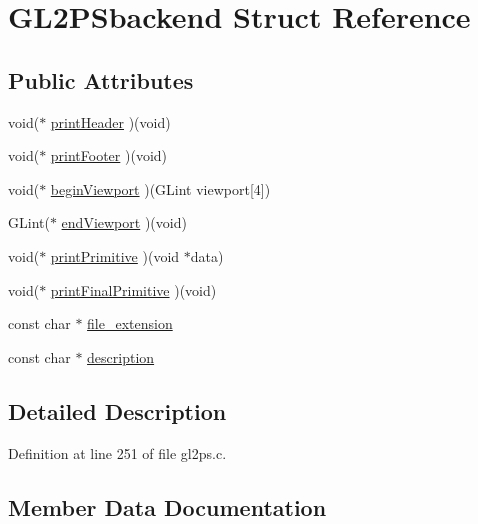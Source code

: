 \hypertarget{struct_g_l2_p_sbackend}{}\section{G\+L2\+P\+Sbackend Struct Reference}
\label{struct_g_l2_p_sbackend}
\subsection*{Public Attributes}
\begin{DoxyCompactItemize}
\item 
void($\ast$ \hyperlink{struct_g_l2_p_sbackend_afdd2bc2b0684ab6bda7f72ce1561bef9}{print\+Header} )(void)
\item 
void($\ast$ \hyperlink{struct_g_l2_p_sbackend_ae7d08efe5024f7e407c63d116cb0ba14}{print\+Footer} )(void)
\item 
void($\ast$ \hyperlink{struct_g_l2_p_sbackend_ae71958ad18c3dbeffdbb3f6895d0bbbf}{begin\+Viewport} )(G\+Lint viewport\mbox{[}4\mbox{]})
\item 
G\+Lint($\ast$ \hyperlink{struct_g_l2_p_sbackend_a73e6d71a33d571184eed89ef1e575786}{end\+Viewport} )(void)
\item 
void($\ast$ \hyperlink{struct_g_l2_p_sbackend_ac2d22418854178ec0e962f684ff3f27e}{print\+Primitive} )(void $\ast$data)
\item 
void($\ast$ \hyperlink{struct_g_l2_p_sbackend_a02d35954f42088ca83bdde31d63a2bb2}{print\+Final\+Primitive} )(void)
\item 
const char $\ast$ \hyperlink{struct_g_l2_p_sbackend_a0a944434004f3751982f107d1b3c0f91}{file\+\_\+extension}
\item 
const char $\ast$ \hyperlink{struct_g_l2_p_sbackend_a8725b2c22957f08b84553f89658aea78}{description}
\end{DoxyCompactItemize}


\subsection{Detailed Description}


Definition at line 251 of file gl2ps.\+c.



\subsection{Member Data Documentation}
\hypertarget{struct_g_l2_p_sbackend_ae71958ad18c3dbeffdbb3f6895d0bbbf}{}
